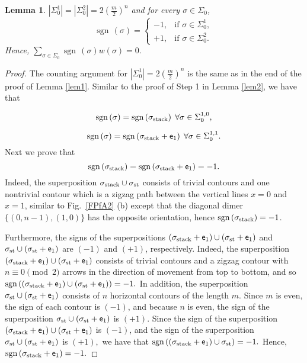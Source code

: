 \documentclass[12pt,reqno]{amsart}
\numberwithin{equation}{section}
\newcommand{\sg}{\sigma}
\newcommand{\sgn}{{\operatorname{sgn}\,}}
\newtheorem{lem}[theo]{{\sc \bf Lemma}}
\begin{document}
\begin{lem}\label{lem44.2}
$|\Sigma_0^1|=|\Sigma_0^2|=2\left(\frac{m}{2}\right)^n$ and for every $\sigma\in\Sigma_0$,\[\sgn(\sigma)=\begin{cases}-1,&\textrm{if }\sigma\in\Sigma_0^1,\\ +1,&\textrm{if }\sigma\in\Sigma_0^2.\end{cases}\]
Hence, $\displaystyle\sum_{\sigma\in\Sigma_0}\sgn(\sg)w(\sg)=0.$
\end{lem}
\begin{proof}
The counting argument for $|\Sigma_0^1|=2\left(\frac{m}{2}\right)^n$ is the same as in the end of the proof of Lemma \ref{lem1}. Similar to the proof of Step 1 in Lemma \ref{lem2}, we have that 

\begin{equation}\label{neg5a1}
\sgn(\sg)=\sgn(\sg_{\rm stack})\;\,\forall\sg\in\Sigma_0^{1,0},
\end{equation}

\begin{equation}\label{neg5b}
\sgn(\sg)=\sgn(\sg_{\rm stack}+\mathsf e_1)\;\,\forall\sg\in\Sigma_0^{1,1}.
\end{equation}
Next we prove that
\begin{equation}\label{neg5c1}
\sgn(\sg_{\rm stack})=\sgn(\sg_{\rm stack}+\mathsf e_1)=-1.
\end{equation}
\noindent Indeed, the superposition $\sg_{\rm stack}\cup\sg_{\rm st}$ consists of trivial contours and one nontrivial contour which is a zigzag path between the vertical lines $x=0$ and $x=1$, similar to Fig.\ \ref{FPfA2} (b) except that the diagonal dimer $\{(0,n-1),(1,0)\}$ has the opposite orientation, hence $\sgn(\sg_{\rm stack})=-1$.

Furthermore, the signs of the superpositions $(\sigma_{\rm stack}+\mathsf e_1)\cup(\sigma_ {\rm st}+\mathsf e_1)$ and $\sigma_{\rm st}\cup(\sigma_{\rm st}+\mathsf e_1)$ are $(-1)$ and $(+1)$, respectively. Indeed, the superposition $(\sigma_{\rm stack}+\mathsf e_1)\cup(\sigma_ {\rm st}+\mathsf e_1)$  consists of trivial contours and a zigzag contour with $n\equiv 0\pmod 2$ arrows in the direction of movement from top to bottom, and so $\sgn((\sigma_{\rm stack}+\mathsf e_1)\cup(\sigma_{\rm st}+\mathsf e_1))=-1.$ In addition, the superposition $\sigma_{\rm st}\cup(\sigma_{\rm st}+\mathsf e_1)$  consists of 
$n$ horizontal contours of the length $m$. Since $m$ is even, the sign of 
each contour is $(-1)$, and
because $n$ is even, the sign of the superposition $\sigma_{\rm st}\cup(\sigma_{\rm st}+\mathsf e_1)$  is $(+1)$.
Since the sign of the superposition 
$(\sigma_{\rm stack}+\mathsf e_1)\cup(\sigma_{\rm st}+\mathsf e_1)$ 
is $(-1)$, and the sign of the superposition $\sigma_{\rm st}\cup(\sigma_{\rm st}+\mathsf e_1)$ is $(+1),$ we have that
$\sgn((\sigma_{\rm stack}+\mathsf e_1)\cup \sigma_{\rm st})=-1.$
Hence, $\sgn(\sigma_{\rm stack}+\mathsf e_1)=-1.$


\end{proof}
\end{document}

